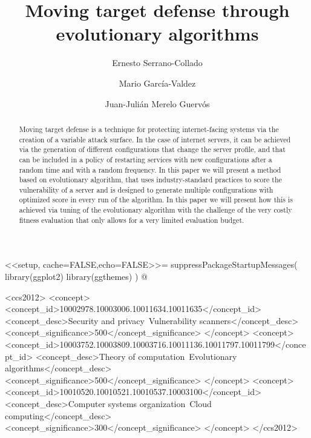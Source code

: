 \documentclass[sigconf]{acmart}
\begin{document}

<<setup, cache=FALSE,echo=FALSE>>=
suppressPackageStartupMessages({
    library(ggplot2)
    library(ggthemes)
})
@

\title{Moving target defense through evolutionary algorithms}

\author{Ernesto Serrano-Collado}

\author{Mario García-Valdez}

\author{Juan-Julián Merelo Guervós}

\renewcommand{\shortauthors}{B. Trovato et al.}


\begin{abstract}

Moving target defense is a technique for protecting internet-facing
systems via the creation of a variable attack surface. In the case of
internet servers, it can be achieved via the generation of different
configurations that change the server profile, and that can be
included in a policy of restarting services with new configurations
after a random time and with a random frequency. In this paper we will
present a method based on evolutionary algorithm, that uses
industry-standard practices to score the vulnerability of a server and
is designed to generate multiple configurations with optimized score
in every run of the algorithm. In this paper we will present how this
is achieved via tuning of the evolutionary algorithm with the
challenge of the very costly fitness evaluation that only allows for a
very limited evaluation budget.
\end{abstract}

\begin{CCSXML}
<ccs2012>
<concept>
<concept_id>10002978.10003006.10011634.10011635</concept_id>
<concept_desc>Security and privacy~Vulnerability scanners</concept_desc>
<concept_significance>500</concept_significance>
</concept>
<concept>
<concept_id>10003752.10003809.10003716.10011136.10011797.10011799</concept_id>
<concept_desc>Theory of computation~Evolutionary algorithms</concept_desc>
<concept_significance>500</concept_significance>
</concept>
<concept>
<concept_id>10010520.10010521.10010537.10003100</concept_id>
<concept_desc>Computer systems organization~Cloud computing</concept_desc>
<concept_significance>300</concept_significance>
</concept>
</ccs2012>
\end{CCSXML}
\end{document}
